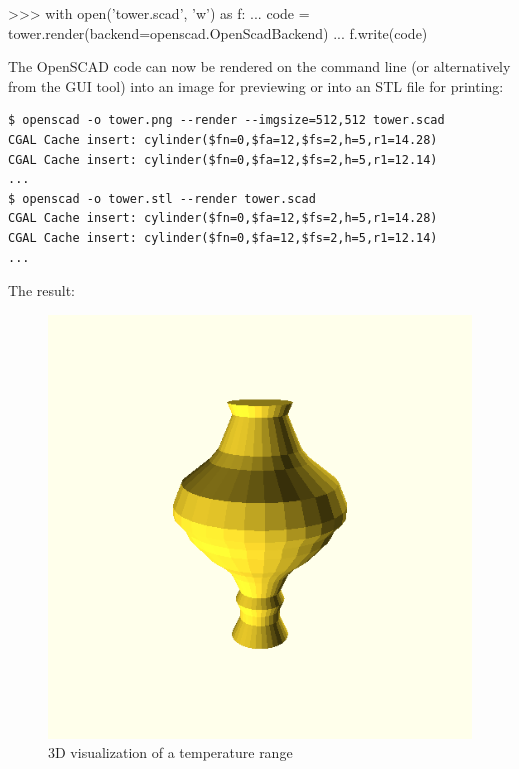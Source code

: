\vspace{.5\baselineskip}
\begin{pythoncode}
>>> with open('tower.scad', 'w') as f:
...     code = tower.render(backend=openscad.OpenScadBackend)
...     f.write(code)
\end{pythoncode}

\noindent The OpenSCAD code can now be rendered on the command line (or
alternatively from the GUI tool) into an image for previewing or into an STL
file for printing:

\vspace{.5\baselineskip}
\begin{verbatim}
$ openscad -o tower.png --render --imgsize=512,512 tower.scad
CGAL Cache insert: cylinder($fn=0,$fa=12,$fs=2,h=5,r1=14.28)
CGAL Cache insert: cylinder($fn=0,$fa=12,$fs=2,h=5,r1=12.14)
...
$ openscad -o tower.stl --render tower.scad
CGAL Cache insert: cylinder($fn=0,$fa=12,$fs=2,h=5,r1=14.28)
CGAL Cache insert: cylinder($fn=0,$fa=12,$fs=2,h=5,r1=12.14)
...
\end{verbatim}

\noindent The result:

\begin{figure}[H]
	\centering
	\includegraphics[height=.28\textheight]{images/usage_tower.png}
	\caption{3D visualization of a temperature range}
	\label{img:usage_tower}
\end{figure}

